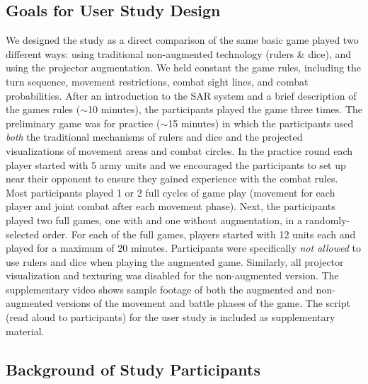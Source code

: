 \vspace{-0.15in}
\subsection
{Goals for User Study Design}

We designed the study as a direct comparison of the same basic game
played two different ways: using traditional non-augmented technology
(rulers \& dice), and using the projector augmentation.  We held
constant the game rules, including the turn sequence, movement
restrictions, combat sight lines, and combat probabilities.
%
After an introduction to the SAR system and a brief description of the
games rules ($\sim$10 minutes), the participants played the game three
times.  The preliminary game was for practice ($\sim$15 minutes)
in which the participants used {\em both} the traditional mechanisms
of rulers and dice and the projected visualizations of movement areas
and combat circles.  In the practice round each player started with 5
army units and we encouraged the participants to set up near their
opponent to ensure they gained experience with the combat rules.  Most
participants played 1 or 2 full cycles of game play (movement for each
player and joint combat after each movement phase).
%
Next, the participants played two full games, one with and one without
augmentation, in a randomly-selected order.  For each of the full
games, players started with 12 units each and played for a maximum of
20 minutes.  Participants were specifically {\em not allowed} to use
rulers and dice when playing the augmented game.  Similarly, all
projector visualization and texturing was disabled for the
non-augmented version.
%
The supplementary video shows sample footage of both the augmented and
non-augmented versions of the movement and battle phases of the game.
The script (read aloud to participants) for the user study is included
as supplementary material.

\vspace{-0.15in}
\subsection{Background of Study Participants}

